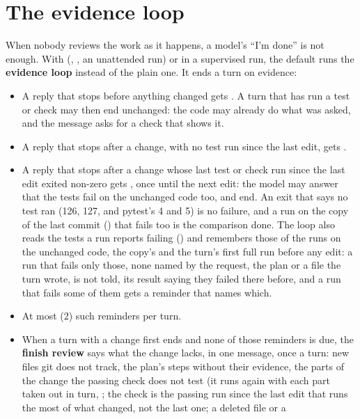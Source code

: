 \section{The evidence loop}

When nobody reviews the work as it happens, a model's ``I'm done'' is not
enough. With  (, , an
unattended run) or in a supervised run, the default  runs
the \textbf{evidence loop} instead of the plain one. It ends a turn on
evidence:

\begin{itemize}
  \item A reply that stops before anything changed gets
    . A turn that has run a test or check
    may then end unchanged: the code may already do what was asked, and the
    message asks for a check that shows it.
  \item A reply that stops after a change, with no test run since the last
    edit, gets .
  \item A reply that stops after a change whose last test or check run since
    the last edit exited non-zero gets , once
    until the next edit: the model may answer that the tests fail on the
    unchanged code too, and end. An exit that says no test ran (126, 127,
    and pytest's 4 and 5) is no failure, and a run on the copy of the last
    commit () that fails too is the comparison done.
    The loop also reads the tests a run reports failing
    () and remembers those of the runs on the unchanged
    code, the copy's and the turn's first full run before any edit: a run
    that fails only those, none named by the request, the plan or a file
    the turn wrote, is not told, its result saying they failed there
    before, and a run that fails some of them gets a reminder that names
    which.
  \item At most  (2) such reminders per turn.
  \item When a turn with a change first ends and none of those reminders is
    due, the \textbf{finish review} says what the change lacks, in one
    message, once a turn: new files git does not track, the plan's steps
    without their evidence, the parts of the change the passing check does
    not test (it runs again with each part taken out in turn,
    ; the check is the passing run since the last edit
    that runs the most of what changed, not the last one; a deleted file or a

\end{itemize}

